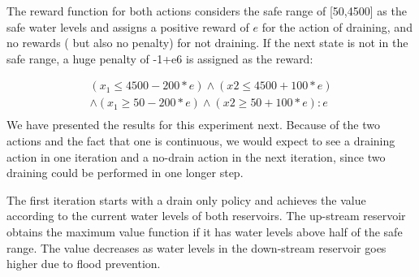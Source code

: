 \documentclass[letterpaper]{article}
\begin{document}
The reward function for both actions considers the safe range of [50,4500] as the safe water levels and assigns a positive reward of $e$ for the action of draining, and no rewards ( but also no penalty) for not draining. If the next state is not in the safe range, a huge penalty of -1+e6 is assigned as the reward:

{\footnotesize
\begin{align*}
(x_1\leq 4500 - 200 * e) \wedge (x2 \leq 4500 +100 *e) \\
\wedge (x_1\geq 50 - 200 * e) \wedge (x2 \geq 50 +100 *e) : e \\
\end{align*}
}
We have presented the results for this experiment next. Because of the two actions and the fact that one is continuous, we would expect to see a draining action in one iteration and a no-drain action in the next iteration, since two  draining could be performed in one longer step.

The first iteration starts with a drain only policy and achieves the value according to the current water levels of both reservoirs. The up-stream reservoir obtains the maximum value function if it has water levels above half of the safe range. The value decreases as water levels in the down-stream reservoir goes higher due to flood prevention. 
\end{document}
